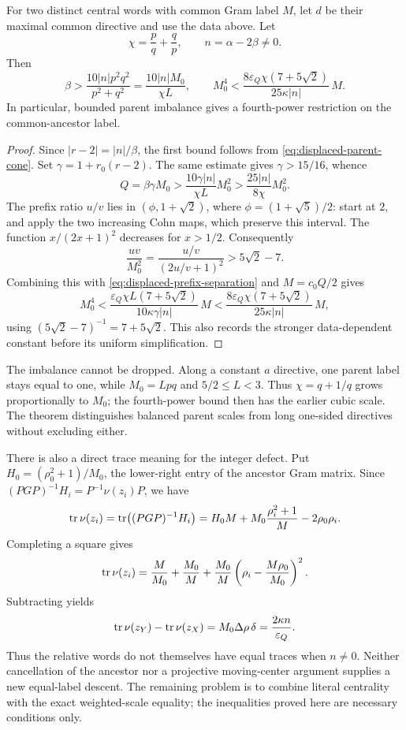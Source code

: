\begin{theorem}
\label{thm:displaced-ancestor-bound}
For two distinct central words with common Gram label $M$, let $d$ be their maximal common directive and use the data above. Let
$$
 \chi=\frac pq+\frac qp,\qquad n=\alpha-2\beta\ne0.
$$
Then
\begin{equation}
 \beta>\frac{10|n|p^2q^2}{p^2+q^2}
 =\frac{10|n|M_0}{\chi L},
 \qquad
 M_0^4<\frac{8\varepsilon_Q\chi(7+5\sqrt2)}{25\kappa|n|}\,M.
 \label{eq:displaced-quartic-bound}
\end{equation}
In particular, bounded parent imbalance gives a fourth-power restriction on the common-ancestor label.
\end{theorem}

\begin{proof}
Since $|r-2|=|n|/\beta$, the first bound follows from \eqref{eq:displaced-parent-cone}. Set $\gamma=1+r_0(r-2)$. The same estimate gives $\gamma>15/16$, whence
$$
 Q=\beta\gamma M_0>
 \frac{10\gamma|n|}{\chi L}M_0^2
 >\frac{25|n|}{8\chi}M_0^2.
$$
The prefix ratio $u/v$ lies in $(\phi,1+\sqrt2)$, where $\phi=(1+\sqrt5)/2$: start at $2$, and apply the two increasing Cohn maps, which preserve this interval. The function $x/(2x+1)^2$ decreases for $x>1/2$. Consequently
$$
 \frac{uv}{M_0^2}=\frac{u/v}{(2u/v+1)^2}>5\sqrt2-7.
$$
Combining this with \eqref{eq:displaced-prefix-separation} and $M=c_0Q/2$ gives
\begin{equation}
 M_0^4<
 \frac{\varepsilon_Q\chi L(7+5\sqrt2)}{10\kappa\gamma|n|}\,M
 <\frac{8\varepsilon_Q\chi(7+5\sqrt2)}{25\kappa|n|}\,M,
 \label{eq:displaced-quartic-refined}
\end{equation}
using $(5\sqrt2-7)^{-1}=7+5\sqrt2$. This also records the stronger data-dependent constant before its uniform simplification.
\end{proof}

The imbalance cannot be dropped. Along a constant $a$ directive, one parent label stays equal to one, while $M_0=Lp q$ and $5/2\leqslant L<3$. Thus $\chi=q+1/q$ grows proportionally to $M_0$; the fourth-power bound then has the earlier cubic scale. The theorem distinguishes balanced parent scales from long one-sided directives without excluding either.

There is also a direct trace meaning for the integer defect. Put $H_0=(\rho_0^2+1)/M_0$, the lower-right entry of the ancestor Gram matrix. Since $(PGP)^{-1}H_i=P^{-1}\nu(z_i)P$, we have
$$
 \operatorname{tr}\nu(z_i)=\operatorname{tr}\bigl((PGP)^{-1}H_i\bigr)
 =H_0M+M_0\frac{\rho_i^2+1}{M}-2\rho_0\rho_i.
$$
Completing a square gives
$$
 \operatorname{tr}\nu(z_i)=\frac M{M_0}+\frac{M_0}M
 +\frac{M_0}M\left(\rho_i-\frac{M\rho_0}{M_0}\right)^2.
$$
Subtracting yields
$$
 \operatorname{tr}\nu(z_Y)-\operatorname{tr}\nu(z_X)
 =M_0\Delta\rho\,\delta
 =\frac{2\kappa n}{\varepsilon_Q}.
$$
Thus the relative words do not themselves have equal traces when $n\ne0$. Neither cancellation of the ancestor nor a projective moving-center argument supplies a new equal-label descent. The remaining problem is to combine literal centrality with the exact weighted-scale equality; the inequalities proved here are necessary conditions only.
